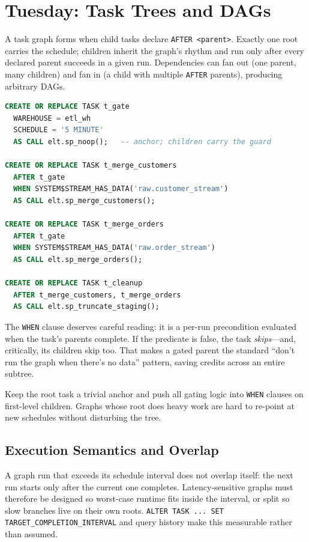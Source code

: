 \section{Tuesday: Task Trees and DAGs}
A task graph forms when child tasks declare \texttt{AFTER <parent>}. Exactly one root carries the schedule; children inherit the graph's rhythm and run only after every declared parent succeeds in a given run. Dependencies can fan out (one parent, many children) and fan in (a child with multiple \texttt{AFTER} parents), producing arbitrary DAGs.

\begin{lstlisting}[language=SQL, caption={A gated CDC task tree}]
CREATE OR REPLACE TASK t_gate
  WAREHOUSE = etl_wh
  SCHEDULE = '5 MINUTE'
  AS CALL elt.sp_noop();   -- anchor; children carry the guard

CREATE OR REPLACE TASK t_merge_customers
  AFTER t_gate
  WHEN SYSTEM$STREAM_HAS_DATA('raw.customer_stream')
  AS CALL elt.sp_merge_customers();

CREATE OR REPLACE TASK t_merge_orders
  AFTER t_gate
  WHEN SYSTEM$STREAM_HAS_DATA('raw.order_stream')
  AS CALL elt.sp_merge_orders();

CREATE OR REPLACE TASK t_cleanup
  AFTER t_merge_customers, t_merge_orders
  AS CALL elt.sp_truncate_staging();
\end{lstlisting}

The \texttt{WHEN} clause deserves careful reading: it is a per-run precondition evaluated when the task's parents complete. If the predicate is false, the task \emph{skips}---and, critically, its children skip too. That makes a gated parent the standard ``don't run the graph when there's no data'' pattern, saving credits across an entire subtree.

\begin{tipbox}
Keep the root task a trivial anchor and push all gating logic into \texttt{WHEN} clauses on first-level children. Graphs whose root does heavy work are hard to re-point at new schedules without disturbing the tree.
\end{tipbox}

\subsection{Execution Semantics and Overlap}
A graph run that exceeds its schedule interval does not overlap itself: the next run starts only after the current one completes. Latency-sensitive graphs must therefore be designed so worst-case runtime fits inside the interval, or split so slow branches live on their own roots. \texttt{ALTER TASK ... SET TARGET\_COMPLETION\_INTERVAL} and query history make this measurable rather than assumed.

